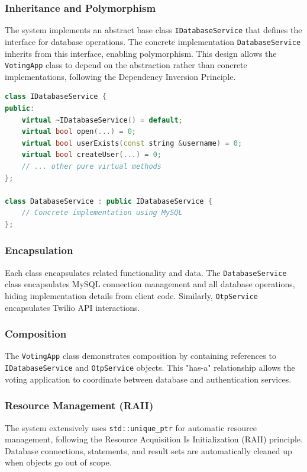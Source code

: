\documentclass[conference]{IEEEtran}
\begin{document}
\subsubsection{Inheritance and Polymorphism}
The system implements an abstract base class \texttt{IDatabaseService} that defines the interface for database operations. The concrete implementation \texttt{DatabaseService} inherits from this interface, enabling polymorphism. This design allows the \texttt{VotingApp} class to depend on the abstraction rather than concrete implementations, following the Dependency Inversion Principle.

\begin{lstlisting}[language=C++, basicstyle=\small]
class IDatabaseService {
public:
    virtual ~IDatabaseService() = default;
    virtual bool open(...) = 0;
    virtual bool userExists(const string &username) = 0;
    virtual bool createUser(...) = 0;
    // ... other pure virtual methods
};

class DatabaseService : public IDatabaseService {
    // Concrete implementation using MySQL
};
\end{lstlisting}

\subsubsection{Encapsulation}
Each class encapsulates related functionality and data. The \texttt{DatabaseService} class encapsulates MySQL connection management and all database operations, hiding implementation details from client code. Similarly, \texttt{OtpService} encapsulates Twilio API interactions.

\subsubsection{Composition}
The \texttt{VotingApp} class demonstrates composition by containing references to \texttt{IDatabaseService} and \texttt{OtpService} objects. This "has-a" relationship allows the voting application to coordinate between database and authentication services.

\subsubsection{Resource Management (RAII)}
The system extensively uses \texttt{std::unique\_ptr} for automatic resource management, following the Resource Acquisition Is Initialization (RAII) principle. Database connections, statements, and result sets are automatically cleaned up when objects go out of scope.
\end{document}

